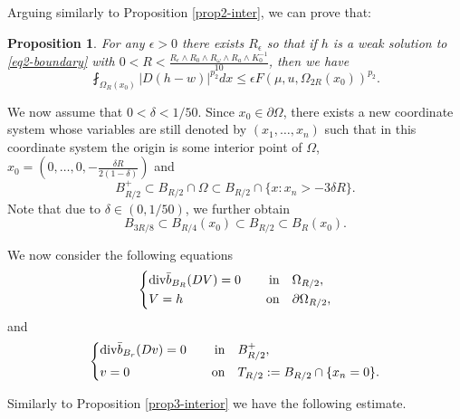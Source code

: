 \documentclass[a4paper,10pt]{amsart}
\newtheorem{prop}[thm]{Proposition}
\newcommand{\f}{\frac}
\newcommand{\om}{\omega}
\newcommand{\Om}{\Omega}
\newcommand{\di}{{\rm div}}
\begin{document}
Arguing similarly to Proposition \ref{prop2-inter}, we can prove that:
\begin{prop}
	\label{prop2-boundary}
	For any $\epsilon>0$ there exists $R_\epsilon$ so that  if $h$ is a weak solution to \eqref{eq2-boundary} with $0<R<\f{R_{\epsilon}\wedge R_0\wedge R_\om\wedge R_a \wedge K_0^{-1}}{10}$, then we have
	\begin{equation}
	\label{eq-prop2-boundary}
	\fint_{\Om_R(x_0)}|D(h-w)|^{p_2}dx\leq \epsilon  F(\mu,u,\Om_{2R}(x_0))^{p_2}.
	\end{equation}
\end{prop}


We now assume that $0<\delta<1/50$. Since $x_0\in \partial\Om$, there exists a new coordinate system whose variables are still denoted by $(x_1,\ldots,x_n)$ such that in this coordinate system the origin is some interior point of $\Om$, $x_0=(0,\ldots,0,-\f{\delta R}{2(1-\delta)})$ and
\begin{equation}\label{eq1-new coordinate}
B_{R/2}^+ \subset B_{R/2}\cap \Om\subset B_{R/2}\cap \{x: x_n>-3\delta R\}.
\end{equation}
Note that due to $\delta\in (0,1/50)$, we further obtain 
\begin{equation}\label{eq2-new coordinate}
B_{3R/8}\subset B_{R/4}(x_0)\subset B_{R/2}\subset B_R(x_0).
\end{equation}

We now consider the following equations
\begin{equation}\label{eq3s-boundary}
\left\{
\begin{aligned}
&\di \bar{b}_{B_R}(DV)=0 \quad &\text{in}& \quad \Om_{R/2},\\
&V=h  \quad &\text{on}& \quad \partial\Om_{R/2},
\end{aligned}
\right.
\end{equation}
and
\begin{equation}\label{eq3-boundary}
\left\{
\begin{aligned}
&\di \bar{b}_{B_r}(Dv)=0 \quad &\text{in}& \quad B^+_{R/2},\\
&v=0  \quad &\text{on}& \quad T_{R/2}:=B_{R/2}\cap\{x_n=0\}.
\end{aligned}
\right.
\end{equation}

Similarly to Proposition \ref{prop3-interior} we have the following estimate.
\end{document}
